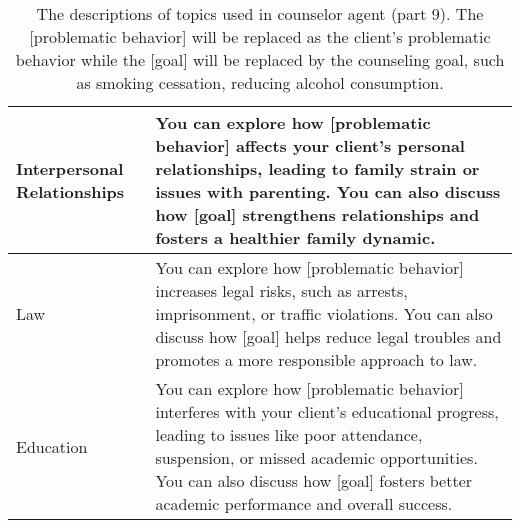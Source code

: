 \begin{table*}[tb]
\begin{tabularx}{\textwidth}{lX}
Interpersonal Relationships & You can explore how [problematic behavior] affects your client’s personal relationships, leading to family strain or issues with parenting. You can also discuss how [goal] strengthens relationships and fosters a healthier family dynamic.                                                                                                                                                                                      \\ \hline
Law                         & You can explore how [problematic behavior] increases legal risks, such as arrests, imprisonment, or traffic violations. You can also discuss how [goal] helps reduce legal troubles and promotes a more responsible approach to law.                                                                                                                                                                                               \\ \hline
Education                   & You can explore how [problematic behavior] interferes with your client’s educational progress, leading to issues like poor attendance, suspension, or missed academic opportunities. You can also discuss how [goal] fosters better academic performance and overall success.
\\ \bottomrule
\end{tabularx}
\caption{The descriptions of topics used in counselor agent (part 9). The [problematic behavior] will be replaced as the client's problematic behavior while the [goal] will be replaced by the counseling goal, such as smoking cessation, reducing alcohol consumption.}
\label{tab:counselor topic description 9}
\end{table*}


